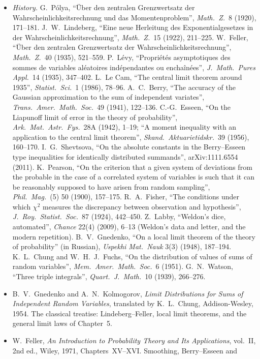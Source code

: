 \begin{itemize}
\item \emph{History.} G.~P\'olya, ``\"Uber den zentralen Grenzwertsatz der Wahrscheinlichkeitsrechnung und das Momentenproblem'', \emph{Math.\ Z.}\ 8 (1920),
171--181. J.~W.~Lindeberg, ``Eine neue Herleitung des Exponentialgesetzes in der Wahrscheinlichkeitsrechnung'', \emph{Math.\ Z.}\ 15 (1922), 211--225. W.~Feller,
``\"Uber den zentralen Grenzwertsatz der Wahrscheinlichkeitsrechnung'', \emph{Math.\ Z.}\ 40 (1935), 521--559. P.~L\'evy, ``Propri\'et\'es asymptotiques des sommes de
variables al\'eatoires ind\'ependantes ou encha\^in\'ees'', \emph{J.\ Math.\ Pures Appl.}\ 14 (1935), 347--402. L.~Le Cam, ``The central limit theorem around 1935'',
\emph{Statist.\ Sci.}\ 1 (1986), 78--96. A.~C.~Berry, ``The accuracy of the Gaussian approximation to the sum of independent variates'', \emph{Trans.\ Amer.\ Math.\ Soc.}\ 49
(1941), 122--136. C.-G.~Esseen, ``On the Liapunoff limit of error in the theory of probability'', \emph{Ark.\ Mat.\ Astr.\ Fys.}\ 28A (1942), 1--19; ``A moment inequality
with an application to the central limit theorem'', \emph{Skand.\ Aktuarietidskr.}\ 39 (1956), 160--170. I.~G.~Shevtsova, ``On the absolute constants in the
Berry--Esseen type inequalities for identically distributed summands'', arXiv:1111.6554 (2011). K.~Pearson, ``On the criterion that a given system of deviations
from the probable in the case of a correlated system of variables is such that it can be reasonably supposed to have arisen from random sampling'',
\emph{Phil.\ Mag.}\ (5) 50 (1900), 157--175. R.~A.~Fisher, ``The conditions under which $\chi^2$ measures the discrepancy between observation and hypothesis'',
\emph{J.\ Roy.\ Statist.\ Soc.}\ 87 (1924), 442--450. Z.~Labby, ``Weldon's dice, automated'', \emph{Chance} 22(4) (2009), 6--13 (Weldon's data and letter, and the
modern repetition). B.~V.~Gnedenko, ``On a local limit theorem of the theory of probability'' (in Russian), \emph{Uspekhi Mat.\ Nauk} 3(3) (1948), 187--194.
K.~L.~Chung and W.~H.~J.~Fuchs, ``On the distribution of values of sums of random variables'', \emph{Mem.\ Amer.\ Math.\ Soc.}\ 6 (1951). G.~N.~Watson, ``Three triple integrals'', \emph{Quart.\ J.\ Math.}\ 10 (1939), 266--276.
\item B.~V.~Gnedenko and A.~N.~Kolmogorov, \emph{Limit Distributions for Sums of Independent Random Variables}, translated by K.~L.~Chung, Addison-Wesley, 1954. The
classical treatise: Lindeberg--Feller, local limit theorems, and the general limit laws of Chapter~5.
\item W.~Feller, \emph{An Introduction to Probability Theory and Its Applications}, vol.~II, 2nd ed., Wiley, 1971, Chapters~XV--XVI. Smoothing, Berry--Esseen and

\end{itemize}

